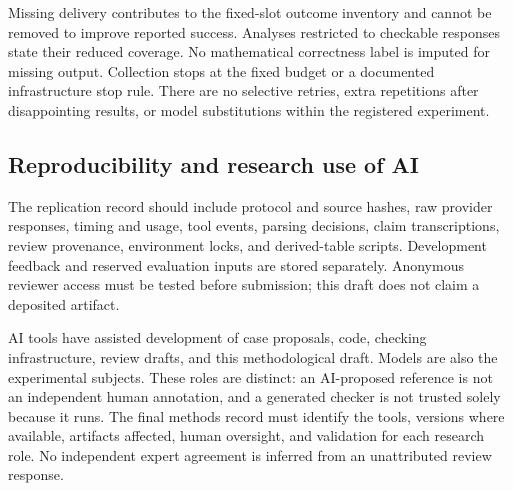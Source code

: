 Missing delivery contributes to the fixed-slot outcome inventory and cannot be
removed to improve reported success. Analyses restricted to checkable responses
state their reduced coverage. No mathematical correctness label is imputed for
missing output. Collection stops at the fixed budget or a documented infrastructure
stop rule. There are no selective retries, extra repetitions after disappointing
results, or model substitutions within the registered experiment.

\subsection{Reproducibility and research use of AI}
The replication record should include protocol and source hashes, raw provider
responses, timing and usage, tool events, parsing decisions, claim transcriptions,
review provenance, environment locks, and derived-table scripts. Development
feedback and reserved evaluation inputs are stored separately. Anonymous reviewer
access must be tested before submission; this draft does not claim a deposited
artifact.

AI tools have assisted development of case proposals, code, checking infrastructure,
review drafts, and this methodological draft. Models are also the experimental
subjects. These roles are distinct: an AI-proposed reference is not an independent
human annotation, and a generated checker is not trusted solely because it runs.
The final methods record must identify the tools, versions where available,
artifacts affected, human oversight, and validation for each research role. No
independent expert agreement is inferred from an unattributed review response.
